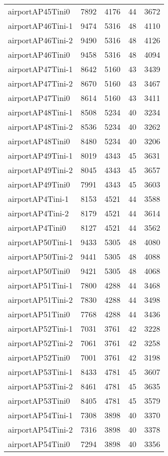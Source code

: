 \begin{longtable}{lrrrr}
airportAP45Tini0 & 7892 & 4176 & 44 & 3672 \\
airportAP46Tini-1 & 9474 & 5316 & 48 & 4110 \\
airportAP46Tini-2 & 9490 & 5316 & 48 & 4126 \\
airportAP46Tini0 & 9458 & 5316 & 48 & 4094 \\
airportAP47Tini-1 & 8642 & 5160 & 43 & 3439 \\
airportAP47Tini-2 & 8670 & 5160 & 43 & 3467 \\
airportAP47Tini0 & 8614 & 5160 & 43 & 3411 \\
airportAP48Tini-1 & 8508 & 5234 & 40 & 3234 \\
airportAP48Tini-2 & 8536 & 5234 & 40 & 3262 \\
airportAP48Tini0 & 8480 & 5234 & 40 & 3206 \\
airportAP49Tini-1 & 8019 & 4343 & 45 & 3631 \\
airportAP49Tini-2 & 8045 & 4343 & 45 & 3657 \\
airportAP49Tini0 & 7991 & 4343 & 45 & 3603 \\
airportAP4Tini-1 & 8153 & 4521 & 44 & 3588 \\
airportAP4Tini-2 & 8179 & 4521 & 44 & 3614 \\
airportAP4Tini0 & 8127 & 4521 & 44 & 3562 \\
airportAP50Tini-1 & 9433 & 5305 & 48 & 4080 \\
airportAP50Tini-2 & 9441 & 5305 & 48 & 4088 \\
airportAP50Tini0 & 9421 & 5305 & 48 & 4068 \\
airportAP51Tini-1 & 7800 & 4288 & 44 & 3468 \\
airportAP51Tini-2 & 7830 & 4288 & 44 & 3498 \\
airportAP51Tini0 & 7768 & 4288 & 44 & 3436 \\
airportAP52Tini-1 & 7031 & 3761 & 42 & 3228 \\
airportAP52Tini-2 & 7061 & 3761 & 42 & 3258 \\
airportAP52Tini0 & 7001 & 3761 & 42 & 3198 \\
airportAP53Tini-1 & 8433 & 4781 & 45 & 3607 \\
airportAP53Tini-2 & 8461 & 4781 & 45 & 3635 \\
airportAP53Tini0 & 8405 & 4781 & 45 & 3579 \\
airportAP54Tini-1 & 7308 & 3898 & 40 & 3370 \\
airportAP54Tini-2 & 7316 & 3898 & 40 & 3378 \\
airportAP54Tini0 & 7294 & 3898 & 40 & 3356 \\

\end{longtable}
